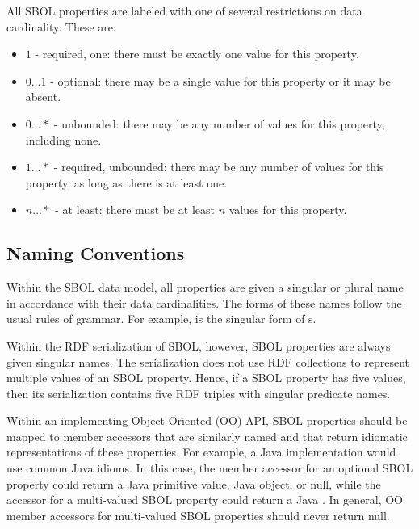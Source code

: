 All SBOL properties are labeled with one of several restrictions on data cardinality. These are:

\begin{itemize}

\item $1$ - required, one: there must be exactly one value for this property.

\item $0 \ldots 1$ - optional: there may be a single value for this property or it may be absent.

\item $0 \ldots *$ - unbounded: there may be any number of values for this property, including none.

\item $1 \ldots *$ - required, unbounded: there may be any number of values for this property, as long as there is at least one.

\item $n \ldots *$ - at least: there must be at least $n$ values for this property.

\end{itemize}

\subsection{Naming Conventions}


Within the SBOL data model, all properties are given a singular or plural name in accordance with their data cardinalities. The forms of these names follow the usual rules of grammar. For example,  is the singular form of s.

Within the RDF serialization of SBOL, however, SBOL properties are always given singular names. The serialization does not use RDF collections to represent multiple values of an SBOL property. Hence, if a SBOL property has five values, then its serialization contains five RDF triples with singular predicate names.

Within an implementing Object-Oriented (OO) API, SBOL properties should be mapped to member accessors that are similarly named and that return idiomatic representations of these properties. For example, a Java implementation would use common Java idioms. In this case, the member accessor for an optional SBOL property could return a Java primitive value, Java object, or null, while the accessor for a multi-valued SBOL property could return a Java . In general, OO member accessors for multi-valued SBOL properties should never return null.

